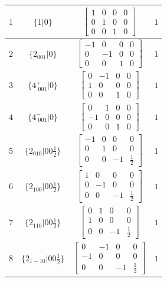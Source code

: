 \documentclass[fleqn,8pt]{jsarticle}
\begin{document}
\begin{longtable}{cccc}
$ 1 $ & $ \{1|0\} $ & $ \begin{bmatrix} 1 & 0 & 0 & 0 \\ 0 & 1 & 0 & 0 \\ 0 & 0 & 1 & 0 \end{bmatrix} $ & $ 1 $ \\ \hline
$ 2 $ & $ \{2{}_{001}|0\} $ & $ \begin{bmatrix} -1 & 0 & 0 & 0 \\ 0 & -1 & 0 & 0 \\ 0 & 0 & 1 & 0 \end{bmatrix} $ & $ 1 $ \\ \hline
$ 3 $ & $ \{4^{+}_{\,\,001}|0\} $ & $ \begin{bmatrix} 0 & -1 & 0 & 0 \\ 1 & 0 & 0 & 0 \\ 0 & 0 & 1 & 0 \end{bmatrix} $ & $ 1 $ \\ \hline
$ 4 $ & $ \{4^{-}_{\,\,001}|0\} $ & $ \begin{bmatrix} 0 & 1 & 0 & 0 \\ -1 & 0 & 0 & 0 \\ 0 & 0 & 1 & 0 \end{bmatrix} $ & $ 1 $ \\ \hline
$ 5 $ & $ \{2{}_{010}|0 0 \frac{1}{2}\} $ & $ \begin{bmatrix} -1 & 0 & 0 & 0 \\ 0 & 1 & 0 & 0 \\ 0 & 0 & -1 & \frac{1}{2} \end{bmatrix} $ & $ 1 $ \\ \hline
$ 6 $ & $ \{2{}_{100}|0 0 \frac{1}{2}\} $ & $ \begin{bmatrix} 1 & 0 & 0 & 0 \\ 0 & -1 & 0 & 0 \\ 0 & 0 & -1 & \frac{1}{2} \end{bmatrix} $ & $ 1 $ \\ \hline
$ 7 $ & $ \{2{}_{110}|0 0 \frac{1}{2}\} $ & $ \begin{bmatrix} 0 & 1 & 0 & 0 \\ 1 & 0 & 0 & 0 \\ 0 & 0 & -1 & \frac{1}{2} \end{bmatrix} $ & $ 1 $ \\ \hline
$ 8 $ & $ \{2{}_{1-10}|0 0 \frac{1}{2}\} $ & $ \begin{bmatrix} 0 & -1 & 0 & 0 \\ -1 & 0 & 0 & 0 \\ 0 & 0 & -1 & \frac{1}{2} \end{bmatrix} $ & $ 1 $ \\ \hline

\end{longtable}
\end{document}
